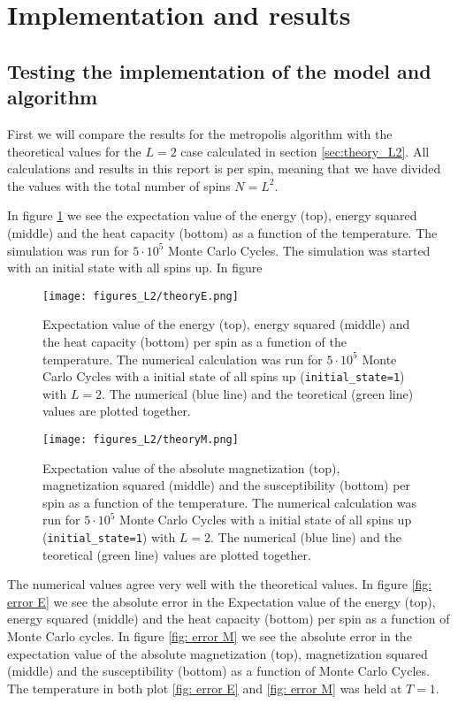 \documentclass[11pt,a4wide]{article}
\begin{document}
\section{Implementation and results}
\subsection{Testing the implementation of the model and algorithm}
First we will compare the results for the metropolis algorithm with the theoretical values for the $L=2$ case calculated in section \ref{sec:theory_L2}. All calculations and results in this report is per spin, meaning that we have divided the values with the total number of spins $N=L^2$. 

In figure \ref{fig:theory E} we see the expectation value of the energy (top), energy squared (middle) and the heat capacity (bottom) as a function of the temperature. The simulation was run for $5\cdot10^5$ Monte Carlo Cycles. The simulation was started with an initial state with all spins up. In figure 

\begin{figure}[htp]
\centering
\texttt{[image: figures\_L2/theoryE.png]}
\caption{Expectation value of the energy (top), energy squared (middle) and the heat capacity (bottom) per spin as a function of the temperature. The numerical calculation was run for $5\cdot10^5$ Monte Carlo Cycles with a initial state of all spins up (\texttt{initial\_state=1}) with $L=2$. The numerical (blue line) and the teoretical (green line) values are plotted together.}
\label{fig:theory E}
\end{figure}

\begin{figure}[htp]
\centering
\texttt{[image: figures\_L2/theoryM.png]}
\caption{ Expectation value of the absolute magnetization (top), magnetization squared (middle) and the susceptibility (bottom) per spin as a function of the temperature. The numerical calculation was run for $5\cdot10^5$ Monte Carlo Cycles with a initial state of all spins up (\texttt{initial\_state=1}) with $L=2$. The numerical (blue line) and the teoretical (green line) values are plotted together.}
\label{fig:theory M}
\end{figure}

The numerical values agree very well with the theoretical values. In figure \ref{fig: error E} we see the absolute error in the Expectation value of the energy (top), energy squared (middle) and the heat capacity (bottom) per spin as a function of Monte Carlo cycles. In figure \ref{fig: error M} we see the absolute error in the expectation value of the absolute magnetization (top), magnetization squared (middle) and the susceptibility (bottom) as a function of Monte Carlo Cycles. The temperature in both plot \ref{fig: error E} and \ref{fig: error M} was held at $T=1$.
\end{document}
